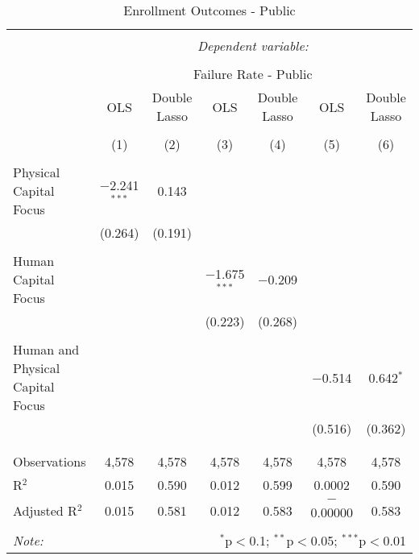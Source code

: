 
\begin{table}[!htbp] \centering 
  \caption{Enrollment Outcomes - Public} 
  \label{} 
\begin{tabular}{@{\extracolsep{5pt}}lcccccc} 
\\[-1.8ex]\hline 
\hline \\[-1.8ex] 
 & \multicolumn{6}{c}{\textit{Dependent variable:}} \\ 
\cline{2-7} 
\\[-1.8ex] & \multicolumn{6}{c}{Failure Rate - Public} \\ 
 & OLS & Double Lasso & OLS & Double Lasso & OLS & Double Lasso \\ 
\\[-1.8ex] & (1) & (2) & (3) & (4) & (5) & (6)\\ 
\hline \\[-1.8ex] 
 Physical Capital Focus & $-$2.241$^{***}$ & 0.143 &  &  &  &  \\ 
  & (0.264) & (0.191) &  &  &  &  \\ 
  & & & & & & \\ 
 Human Capital Focus &  &  & $-$1.675$^{***}$ & $-$0.209 &  &  \\ 
  &  &  & (0.223) & (0.268) &  &  \\ 
  & & & & & & \\ 
 Human and Physical Capital Focus &  &  &  &  & $-$0.514 & 0.642$^{*}$ \\ 
  &  &  &  &  & (0.516) & (0.362) \\ 
  & & & & & & \\ 
\hline \\[-1.8ex] 
Observations & 4,578 & 4,578 & 4,578 & 4,578 & 4,578 & 4,578 \\ 
R$^{2}$ & 0.015 & 0.590 & 0.012 & 0.599 & 0.0002 & 0.590 \\ 
Adjusted R$^{2}$ & 0.015 & 0.581 & 0.012 & 0.583 & $-$0.00000 & 0.583 \\ 
\hline 
\hline \\[-1.8ex] 
\textit{Note:}  & \multicolumn{6}{r}{$^{*}$p$<$0.1; $^{**}$p$<$0.05; $^{***}$p$<$0.01} \\ 
\end{tabular} 
\end{table} 
